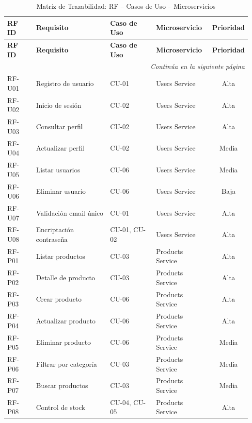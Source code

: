 \documentclass[12pt,a4paper]{article}
\begin{document}
\begin{longtable}{llllc}
\caption{Matriz de Trazabilidad: RF -- Casos de Uso -- Microservicios} \label{tab:trazabilidad} \\
\toprule
\textbf{RF ID} & \textbf{Requisito} & \textbf{Caso de Uso} & \textbf{Microservicio} & \textbf{Prioridad} \\
\midrule
\endfirsthead
\toprule
\textbf{RF ID} & \textbf{Requisito} & \textbf{Caso de Uso} & \textbf{Microservicio} & \textbf{Prioridad} \\
\midrule
\endhead
\midrule
\multicolumn{5}{r}{\textit{Contin\'ua en la siguiente p\'agina}} \\
\endfoot
\bottomrule
\endlastfoot
RF-U01 & Registro de usuario       & CU-01       & Users Service     & Alta  \\
RF-U02 & Inicio de sesi\'on        & CU-02       & Users Service     & Alta  \\
RF-U03 & Consultar perfil          & CU-02       & Users Service     & Alta  \\
RF-U04 & Actualizar perfil         & CU-02       & Users Service     & Media \\
RF-U05 & Listar usuarios           & CU-06       & Users Service     & Media \\
RF-U06 & Eliminar usuario          & CU-06       & Users Service     & Baja  \\
RF-U07 & Validaci\'on email \'unico & CU-01      & Users Service     & Alta  \\
RF-U08 & Encriptaci\'on contrase\~na & CU-01, CU-02 & Users Service  & Alta  \\
\midrule
RF-P01 & Listar productos          & CU-03       & Products Service  & Alta  \\
RF-P02 & Detalle de producto       & CU-03       & Products Service  & Alta  \\
RF-P03 & Crear producto            & CU-06       & Products Service  & Alta  \\
RF-P04 & Actualizar producto       & CU-06       & Products Service  & Alta  \\
RF-P05 & Eliminar producto         & CU-06       & Products Service  & Media \\
RF-P06 & Filtrar por categor\'ia   & CU-03       & Products Service  & Media \\
RF-P07 & Buscar productos          & CU-03       & Products Service  & Media \\
RF-P08 & Control de stock          & CU-04, CU-05 & Products Service & Alta  \\

\end{longtable}
\end{document}
